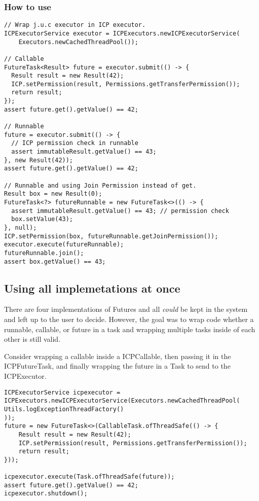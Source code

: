 \subsubsection*{How to use}
\begin{lstlisting}
// Wrap j.u.c executor in ICP executor.
ICPExecutorService executor = ICPExecutors.newICPExecutorService(
    Executors.newCachedThreadPool());

// Callable
FutureTask<Result> future = executor.submit(() -> {
  Result result = new Result(42);
  ICP.setPermission(result, Permissions.getTransferPermission());
  return result;
});
assert future.get().getValue() == 42;

// Runnable
future = executor.submit(() -> {
  // ICP permission check in runnable
  assert immutableResult.getValue() == 43;
}, new Result(42));
assert future.get().getValue() == 42;

// Runnable and using Join Permission instead of get.
Result box = new Result(0);
FutureTask<?> futureRunnable = new FutureTask<>(() -> {
  assert immutableResult.getValue() == 43; // permission check
  box.setValue(43);
}, null);
ICP.setPermission(box, futureRunnable.getJoinPermission());
executor.execute(futureRunnable);
futureRunnable.join();
assert box.getValue() == 43;
\end{lstlisting}

\subsection{Using all implemetations at once}
There are four implementations of Futures and all \textit{could} be kept in the system and left up
to the user to decide. However, the goal was to wrap code whether a runnable, callable, or future in
a task and wrapping multiple tasks inside of each other is still valid.

Consider wrapping a callable inside a ICPCallable, then passing it in the ICPFutureTask, and finally
wrapping the future in a Task to send to the ICPExecutor.

\begin{lstlisting}[caption=Multiple implemetations simultaneously]
ICPExecutorService icpexecutor = ICPExecutors.newICPExecutorService(Executors.newCachedThreadPool(
Utils.logExceptionThreadFactory()
));
future = new FutureTask<>(CallableTask.ofThreadSafe(() -> {
    Result result = new Result(42);
    ICP.setPermission(result, Permissions.getTransferPermission());
    return result;
}));

icpexecutor.execute(Task.ofThreadSafe(future));
assert future.get().getValue() == 42;
icpexecutor.shutdown();
\end{lstlisting}

